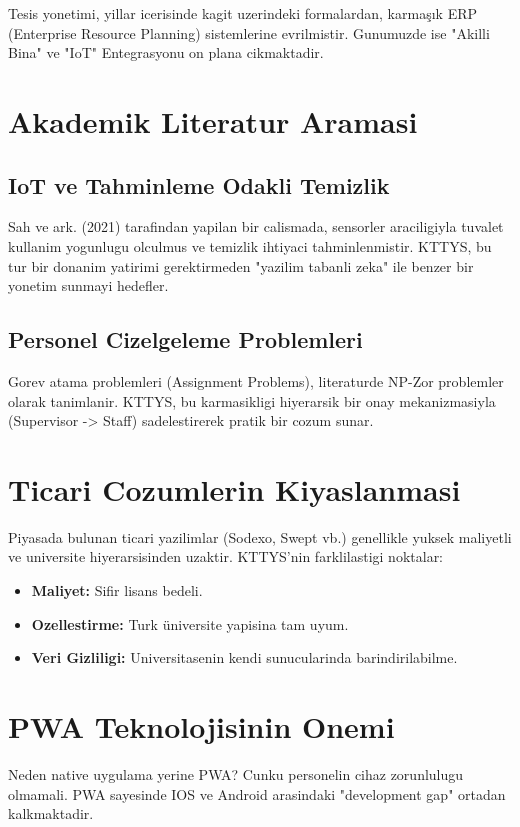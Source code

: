\documentclass[12pt,a4paper,oneside]{report}
\begin{document}
Tesis yonetimi, yillar icerisinde kagit uzerindeki formalardan, karmaşık ERP (Enterprise Resource Planning) sistemlerine evrilmistir. Gunumuzde ise "Akilli Bina" ve "IoT" Entegrasyonu on plana cikmaktadir.

\section{Akademik Literatur Aramasi}

\subsection{IoT ve Tahminleme Odakli Temizlik}
Sah ve ark. (2021) tarafindan yapilan bir calismada, sensorler araciligiyla tuvalet kullanim yogunlugu olculmus ve temizlik ihtiyaci tahminlenmistir. KTTYS, bu tur bir donanim yatirimi gerektirmeden "yazilim tabanli zeka" ile benzer bir yonetim sunmayi hedefler.

\subsection{Personel Cizelgeleme Problemleri}
Gorev atama problemleri (Assignment Problems), literaturde NP-Zor problemler olarak tanimlanir. KTTYS, bu karmasikligi hiyerarsik bir onay mekanizmasiyla (Supervisor -> Staff) sadelestirerek pratik bir cozum sunar.

\section{Ticari Cozumlerin Kiyaslanmasi}

Piyasada bulunan ticari yazilimlar (Sodexo, Swept vb.) genellikle yuksek maliyetli ve universite hiyerarsisinden uzaktir. KTTYS'nin farklilastigi noktalar:
\begin{itemize}
    \item \textbf{Maliyet:} Sifir lisans bedeli.
    \item \textbf{Ozellestirme:} Turk üniversite yapisina tam uyum.
    \item \textbf{Veri Gizliligi:} Universitasenin kendi sunucularinda barindirilabilme.
\end{itemize}

\section{PWA Teknolojisinin Onemi}

Neden native uygulama yerine PWA? Cunku personelin cihaz zorunlulugu olmamali. PWA sayesinde IOS ve Android arasindaki "development gap" ortadan kalkmaktadir.
\end{document}
